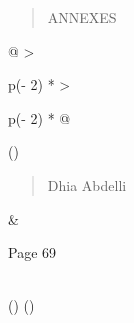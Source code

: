 \documentclass[
]{article}
\begin{document}
\begin{quote}
ANNEXES
\end{quote}

\begin{longtable}[]{@{}
  >{\raggedright\arraybackslash}p{(\columnwidth - 2\tabcolsep) * }
  >{\raggedright\arraybackslash}p{(\columnwidth - 2\tabcolsep) * }@{}}
\toprule()
\begin{minipage}[b]{\linewidth}\raggedright
\begin{quote}
Dhia Abdelli
\end{quote}
\end{minipage} & \begin{minipage}[b]{\linewidth}\raggedright
Page 69
\end{minipage} \\
\midrule()
\endhead
\bottomrule()
\end{longtable}
\end{document}

